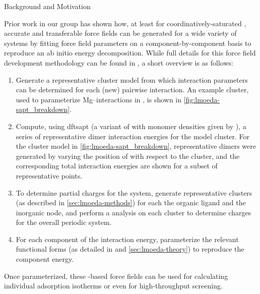 \begin{section}{Background and Motivation}
\label{sec:lmoeda-background}

Prior work in our group has shown how, at least for coordinatively-saturated \mofs,
accurate and transferable force fields can be generated for a wide variety of
systems by fitting force field parameters on a component-by-component basis to
reproduce an ab initio \sapt energy
decomposition.\cite{McDaniel2012,McDaniel2012a} 
While full details for this force field development methodology can be found
in , a short overview is as follows:
%
\begin{enumerate}
\item 
Generate a representative cluster model
from which interaction parameters can be determined for each (new) pairwise
interaction.
An example cluster, used to parameterize Mg--\co interactions in \mgmof, is
shown in \cref{fig:lmoeda-sapt_breakdown}.
%
\item 
Compute, using \acrshort{dftsapt} (a variant of \sapt with monomer densities given
by \dft), a series of representative dimer interaction energies for the model
cluster. For the cluster model in \cref{fig:lmoeda-sapt_breakdown},
representative dimers were generated by varying the position of \co with
respect to the \mof cluster, and the corresponding \dftsapt total interaction
energies are shown for a subset of representative points.
%
\item
To determine partial charges for the system, generate representative clusters
(as described in \cref{sec:lmoeda-methods}) for each the organic ligand and
the inorganic node, and perform a \dma analysis on each cluster to determine
charges for the overall periodic system.
%
\item 
For each component of the \dftsapt interaction energy, 
parameterize the relevant functional forms (as detailed in  and
\cref{sec:lmoeda-theory}) to reproduce the \dftsapt component energy.
\end{enumerate}

Once parameterized, these \sapt-based \mof force fields can be used
for calculating individual adsorption isotherms or even for high-throughput
screening.\cite{McDaniel2015} 


\end{section}
